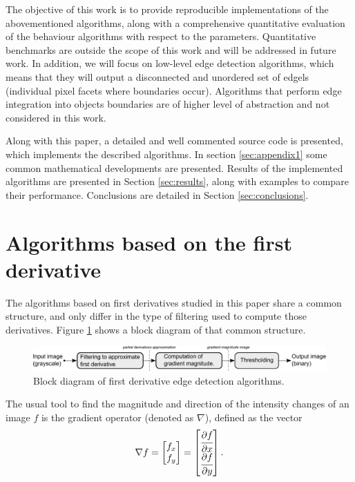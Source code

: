\documentclass{ipol}
\numberwithin{equation}{section}
\numberwithin{table}{section}
\begin{document}
The objective of this work is to provide reproducible implementations of the abovementioned algorithms, along with a comprehensive quantitative evaluation of the behaviour algorithms with respect to the parameters. Quantitative benchmarks are outside the scope of this work and will be addressed in future work.
In addition, we will focus on low-level edge detection algorithms, which means that they will output a disconnected and unordered set of edgels (individual pixel facets where boundaries occur). Algorithms that perform edge integration into objects boundaries are of higher level of abstraction and not considered in this work.

Along with this paper, a detailed and well commented source code is presented, which 
implements the described algorithms. In section \ref{sec:appendix1} some common mathematical developments are presented. 
Results of the implemented algorithms are presented in Section \ref{sec:results}, along with examples 
to compare their performance. Conclusions are detailed in Section \ref{sec:conclusions}.

\nocite{IPOL}


\section{Algorithms based on the first derivative}
\label{sec:first}

The algorithms based on first derivatives studied in this paper share a common structure, and only differ in the type of filtering used to compute those derivatives. Figure \ref{fig:blockdiagram1} shows a block diagram of that common structure. \\

\begin{figure}[h!]
	\centering
	\includegraphics[width=\textwidth]{blockdiagram1.pdf}
	\caption{Block diagram of first derivative edge detection algorithms.}
	\label{fig:blockdiagram1}
\end{figure}

The usual tool to find the magnitude and direction of the
intensity changes of an image $f$ is the gradient operator (denoted as $\nabla$), defined 
as the vector
\begin{equation}
	\nabla f = 
				\begin{bmatrix} 
					f_x \\ f_y
				\end{bmatrix}
	=				
				\begin{bmatrix} 
					\cfrac{\partial f}{\partial x} \\ \cfrac{\partial f}{\partial y} \\
				\end{bmatrix}.
\end{equation}
\end{document}
